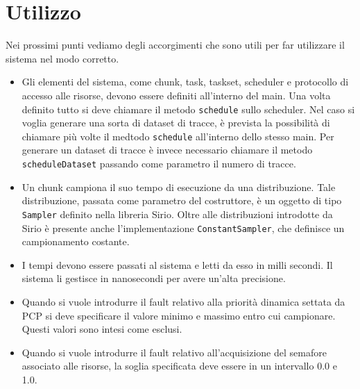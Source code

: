 \section{Utilizzo}
Nei prossimi punti vediamo degli accorgimenti che sono utili per far utilizzare il sistema nel modo corretto.
\begin{itemize}
    \item Gli elementi del sistema, come chunk, task, taskset, scheduler e protocollo di accesso alle risorse, devono essere definiti all'interno del main. Una volta definito tutto si deve chiamare il metodo \texttt{schedule} sullo scheduler. Nel caso si voglia generare una sorta di dataset di tracce, è prevista la possibilità di chiamare più volte il medtodo \texttt{schedule} all'interno dello stesso main. Per generare un dataset di tracce è invece necessario chiamare il metodo \texttt{scheduleDataset} passando come parametro il numero di tracce.
    \item Un chunk campiona il suo tempo di esecuzione da una distribuzione. Tale distribuzione, passata come parametro del costruttore, è un oggetto di tipo \texttt{Sampler} definito nella libreria Sirio. Oltre alle distribuzioni introdotte da Sirio è presente anche l'implementazione \texttt{ConstantSampler}, che definisce un campionamento costante.
    \item I tempi devono essere passati al sistema e letti da esso in milli secondi. Il sistema li gestisce in nanosecondi per avere un'alta precisione.
    \item Quando si vuole introdurre il fault relativo alla priorità dinamica settata da PCP si deve specificare il valore minimo e massimo entro cui campionare. Questi valori sono intesi come esclusi.
    \item Quando si vuole introdurre il fault relativo all'acquisizione del semafore associato alle risorse, la soglia specificata deve essere in un intervallo 0.0 e 1.0.
\end{itemize}